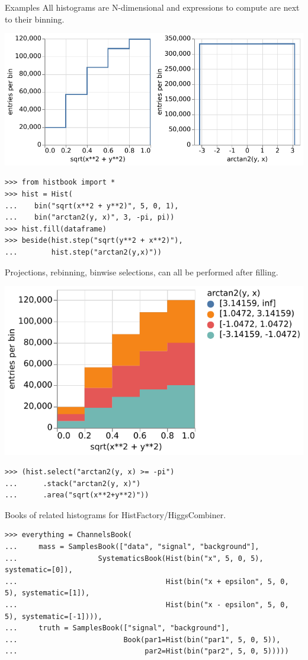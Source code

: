 \documentclass[aspectratio=169]{beamer}
\begin{document}
\begin{frame}[fragile]{Examples}
\vspace{0.1 cm}
All histograms are N-dimensional and expressions to compute are next to their binning.

\vspace{0.2 cm}
\hfill \includegraphics[height=2.3 cm]{histbook-beside.pdf}

\vspace{-2.5 cm}
\scriptsize
\begin{verbatim}
>>> from histbook import *
>>> hist = Hist(
...    bin("sqrt(x**2 + y**2)", 5, 0, 1),
...    bin("arctan2(y, x)", 3, -pi, pi))
>>> hist.fill(dataframe)
>>> beside(hist.step("sqrt(y**2 + x**2)"),
...        hist.step("arctan2(y,x)"))
\end{verbatim}
\normalsize

\vspace{0.1 cm}
Projections, rebinning, binwise selections, can all be performed after filling.

\vspace{0.2 cm}
\hfill \includegraphics[height=2.3 cm]{histbook-stack.pdf}

\vspace{-2.5 cm}
\scriptsize
\begin{verbatim}
>>> (hist.select("arctan2(y, x) >= -pi")
...      .stack("arctan2(y, x)")
...      .area("sqrt(x**2+y**2)"))
\end{verbatim}
\normalsize

\vspace{0.4 cm}
Books of related histograms for HistFactory/HiggsCombiner.

\tiny
\begin{verbatim}
>>> everything = ChannelsBook(
...     mass = SamplesBook(["data", "signal", "background"],
...                   SystematicsBook(Hist(bin("x", 5, 0, 5), systematic=[0]),
...                                   Hist(bin("x + epsilon", 5, 0, 5), systematic=[1]),
...                                   Hist(bin("x - epsilon", 5, 0, 5), systematic=[-1]))),
...     truth = SamplesBook(["signal", "background"],
...                         Book(par1=Hist(bin("par1", 5, 0, 5)),
...                              par2=Hist(bin("par2", 5, 0, 5)))))
\end{verbatim}
\end{frame}
\end{document}
